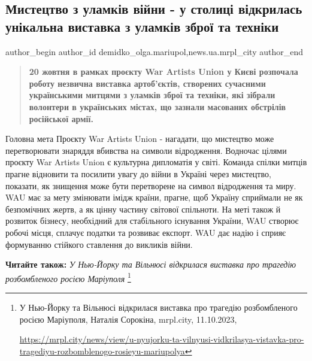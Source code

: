  
 
 
 
 
 
\subsection{Мистецтво з уламків війни - у столиці відкрилась унікальна виставка з уламків зброї та техніки}
\label{sec:23_10_2023.stz.news.ua.mrpl_city.1.mystectvo_z_ulamkiv_vijny_kyiv_vystavka}
 
\ifcmt
 author_begin
   author_id demidko_olga.mariupol,news.ua.mrpl_city
 author_end
\fi

\begin{quote}
\bfseries
20 жовтня в рамках проєкту War Artists Union у Києві розпочала роботу
незвична виставка артоб'єктів, створених сучасними українськими митцями з
уламків зброї та техніки, які зібрали волонтери в українських містах, що
зазнали масованих обстрілів російської армії.
\end{quote}

Головна мета Проєкту War Artists Union - нагадати, що мистецтво може
перетворювати знаряддя вбивства на символи відродження. Водночас цілями проєкту
War Artists Union є культурна дипломатія у світі. Команда спілки митців прагне
відновити та посилити увагу до війни в Україні через мистецтво, показати, як
знищення може бути перетворене на символ відродження та миру. WAU має за мету
змінювати імідж країни, прагне, щоб Україну сприймали не як безпомічних жертв,
а як цінну частину світової спільноти. На меті також й розвиток бізнесу,
необхідний для стабільного існування України, WAU створює робочі місця, сплачує
податки та розвиває експорт. WAU дає надію і сприяє формуванню стійкого
ставлення до викликів війни.

\textbf{Читайте також:} \emph{У Нью-Йорку та Вільнюсі відкрилася виставка про трагедію розбомбленого росією Маріуполя}%
\footnote{У Нью-Йорку та Вільнюсі відкрилася виставка про трагедію розбомбленого росією Маріуполя, Наталія Сорокіна, %
mrpl.city, 11.10.2023, \par%
\url{https://mrpl.city/news/view/u-nyujorku-ta-vilnyusi-vidkrilasya-vistavka-pro-tragediyu-rozbomblenogo-rosieyu-mariupolya}
}

